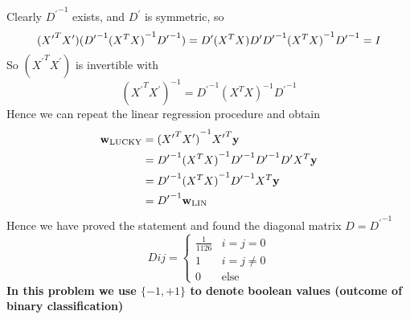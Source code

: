 \documentclass[11pt]{article}
\theoremstyle{definition}
\begin{document}
Clearly ${D^\prime}^{-1}$ exists, and $D^\prime$ is symmetric, so
\[
  ({X^\prime}^{T}X^\prime)({D^\prime}^{-1}{(X^TX)}^{-1}{D^\prime}^{-1}) \\ 
  = D^\prime(X^TX)D^\prime{D^\prime}^{-1}{(X^TX)}^{-1}{D^\prime}^{-1} = I
\]
So $({X^\prime}^{T}X^\prime)$ is invertible with 
\[
  {({X^\prime}^TX^\prime)}^{-1} = {D^\prime}^{-1}{(X^TX)}^{-1}{D^\prime}^{-1}
\]
Hence we can repeat the linear regression procedure and obtain
\begin{align*}
  \vb{w}_{\text{LUCKY}} &= {({X^\prime}^TX^\prime)}^{-1}{X^\prime}^T\vb{y} \\ 
  &= {D^\prime}^{-1}{(X^TX)}^{-1}{D^\prime}^{-1}{D^\prime}^{-1}D^\prime X^T \vb{y}\\ 
  &= {D^\prime}^{-1}{(X^TX)}^{-1}{D^\prime}^{-1}X^T\vb{y} \\ 
  &= {D^\prime}^{-1}\vb{w}_{\text{LIN}}
\end{align*}
Hence we have proved the statement and found the diagonal matrix $D = {D^\prime}^{-1}$
\[
  D{ij} = 
  \begin{cases}
    \frac{1}{1126} & i = j = 0 \\
    1 & i = j \neq 0 \\
    0 & \text{else}
  \end{cases}
\]
\newpage
\large{\textbf{In this problem we use $\{-1, +1\}$ to denote boolean values (outcome of binary classification)}}
\end{document}
